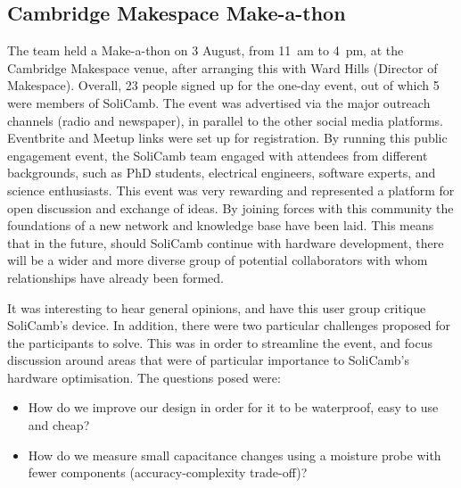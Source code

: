 \subsection{Cambridge Makespace Make-a-thon}

The team held a Make-a-thon on 3 August, from 11~am to 4~pm, at the Cambridge Makespace venue, after arranging this with Ward Hills (Director of Makespace). %
Overall, 23 people signed up for the one-day event, out of which 5 were members of SoliCamb. The event was advertised via the major outreach channels (radio and newspaper), in parallel to the other social media platforms. Eventbrite and Meetup links were set up for registration. By running this public engagement event, the SoliCamb team engaged %
with attendees from different backgrounds, such as PhD students, electrical engineers, software experts, and science enthusiasts.   %
This event was very rewarding and represented a platform for open discussion and exchange of ideas. By joining forces with this community the foundations of a new network and knowledge base have been laid. This means that in the future, should SoliCamb continue with hardware development, there will be a wider and more diverse group of potential collaborators with whom relationships have already been formed. 

It was interesting to hear general opinions, and have this user group critique SoliCamb's device. In addition, there were two particular challenges proposed for the participants to solve. This was in order to %
streamline the event, and %
focus discussion around areas that were of particular importance to SoliCamb's hardware optimisation. The questions posed were:

\begin{itemize}
  \item How do we improve our design in order for it to be waterproof, easy to use and cheap?
  \item How do we measure small capacitance changes using a moisture probe with fewer components (accuracy-complexity trade-off)?
\end{itemize}


